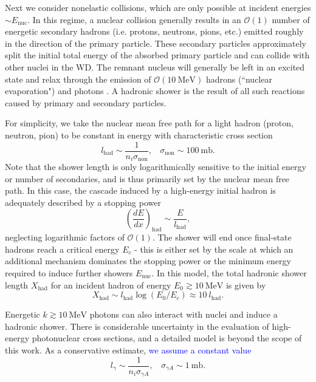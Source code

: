 \documentclass[twocolumn,showpacs,preprintnumbers,amsmath,amssymb,prd]{revtex4}
\newcommand{\OO}{\mathcal{O}}
\def\r{\right)}
\def\l{\left(}
\begin{document}
\begin{appendices}
Next we consider nonelastic collisions, which are only possible at incident energies $\sim E_\text{nuc}$. In this regime, a nuclear collision generally results in an $\OO(1)$ number of energetic secondary hadrons (i.e. protons, neutrons, pions, etc.) emitted roughly in the direction of the primary particle. These secondary particles approximately split the initial total energy of the absorbed primary particle and can collide with other nuclei in the WD. The remnant nucleus will generally be left in an excited state and relax through the emission of $\OO(10 ~\text{MeV})$ hadrons (``nuclear evaporation") and photons \cite{Rossi}. A hadronic shower is the result of all such reactions caused by primary and secondary particles.

For simplicity, we take the nuclear mean free path for a light hadron (proton, neutron, pion) to be constant in energy with characteristic cross section
\begin{equation}
l_\text{had} \sim  \frac{1}{n_i \sigma_\text{non}}, ~~~~ \sigma_\text{non} \sim 100 ~\text{mb}.
\end{equation}
Note that the shower length is only logarithmically sensitive to the initial energy or number of secondaries, and is thus primarily set by the nuclear mean free path. In this case, the cascade induced by a high-energy initial hadron is adequately described by a stopping power
\begin{equation}
\label{eq:nucshower}
\l \frac{dE}{dx}\r_\text{had} \sim \frac{E}{l_\text{had}},
\end{equation}
neglecting logarithmic factors of $\OO(1)$. The shower will end once final-state hadrons reach a critical energy $E_c$ - this is either set by the scale at which an additional mechanism dominates the stopping power or the minimum energy required to induce further showers $E_\text{nuc}$. In this model, the total hadronic shower length $X_{\text{had}}$ for an incident hadron of energy $E_0 \gtrsim 10 ~\text{MeV}$ is given by
\begin{equation}
X_{\text{had}} \sim l_\text{had} \log{(E_0/E_c)} \approx 10 ~l_\text{had}.
\end{equation}

Energetic $k \gtrsim 10 ~\text{MeV}$ photons can also interact with nuclei and induce a hadronic shower. There is considerable uncertainty in the evaluation of high-energy photonuclear cross sections, and a detailed model is beyond the scope of this work. As a conservative estimate, \textcolor{blue}{we assume a constant value}
\begin{equation}
l_\gamma \sim \frac{1}{n_i \sigma_{\gamma A}}, ~~~~ \sigma_{\gamma A} \sim 1 ~\text{mb}.
\end{equation}


\end{appendices}
\end{document}
